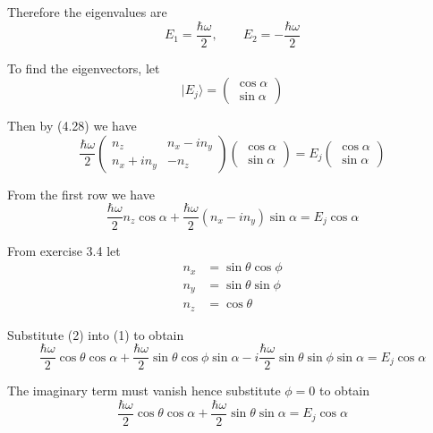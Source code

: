 \documentclass[12pt]{article}
\begin{document}
Therefore the eigenvalues are
\begin{equation*}
E_1=\frac{\hbar\omega}{2},\qquad E_2=-\frac{\hbar\omega}{2}
\end{equation*}

To find the eigenvectors, let
\begin{equation*}
|E_j\rangle=\begin{pmatrix}\cos\alpha\\\sin\alpha\end{pmatrix}
\end{equation*}

Then by (4.28) we have
\begin{equation*}
\frac{\hbar\omega}{2}
\begin{pmatrix}
n_z & n_x-in_y
\\
n_x+in_y & -n_z
\end{pmatrix}
\begin{pmatrix}\cos\alpha\\\sin\alpha\end{pmatrix}
=E_j\begin{pmatrix}\cos\alpha\\\sin\alpha\end{pmatrix}
\end{equation*}

From the first row we have
\begin{equation*}
\frac{\hbar\omega}{2}n_z\cos\alpha+\frac{\hbar\omega}{2}(n_x-in_y)\sin\alpha
=E_j\cos\alpha
\tag{1}
\end{equation*}

From exercise 3.4 let
\begin{equation*}
\begin{aligned}
n_x&=\sin\theta\cos\phi
\\
n_y&=\sin\theta\sin\phi
\\
n_z&=\cos\theta
\end{aligned}
\tag{2}
\end{equation*}

Substitute (2) into (1) to obtain
\begin{equation*}
\frac{\hbar\omega}{2}\cos\theta\cos\alpha
+\frac{\hbar\omega}{2}\sin\theta\cos\phi\sin\alpha
-i\frac{\hbar\omega}{2}\sin\theta\sin\phi\sin\alpha
=E_j\cos\alpha
\end{equation*}

The imaginary term must vanish hence substitute $\phi=0$ to obtain
\begin{equation*}
\frac{\hbar\omega}{2}\cos\theta\cos\alpha+\frac{\hbar\omega}{2}\sin\theta\sin\alpha
=E_j\cos\alpha
\end{equation*}
\end{document}
